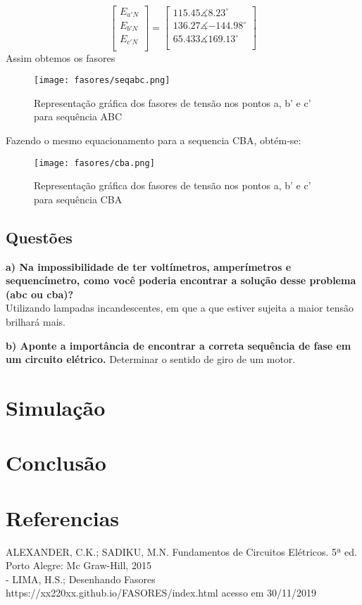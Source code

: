 \documentclass[a4paper, 12pt]{article}
\begin{document}
			\[\begin{bmatrix}
				E_{a'N} \\
				E_{b'N} \\
				E_{c'N} \\
			\end{bmatrix}
			=
			\begin{bmatrix}
				115.45\measuredangle{8.23^\circ} \\
				136.27\measuredangle{-144.98^\circ} \\
				65.433\measuredangle{169.13^\circ} \\
			\end{bmatrix}
			\]
			Assim obtemos os fasores
			\begin{figure}[H]
				\centering %
				\texttt{[image: fasores/seqabc.png]}
				\caption{Representação gráfica dos fasores de tensão nos pontos a, b' e c' para sequência ABC}
			\end{figure}
			\newpage
			Fazendo o mesmo equacionamento para a sequencia CBA, obtém-se:
			\begin{figure}[H]
				\centering %
				\texttt{[image: fasores/cba.png]}
				\caption{Representação gráfica dos fasores de tensão nos pontos a, b' e c' para sequência CBA}
			\end{figure}
			\newpage
			\justifying
			\subsection{Questões}
			\textbf{a) Na impossibilidade de ter voltímetros, amperímetros e sequencímetro, como você poderia
			encontrar a solução desse problema (abc ou cba)?
			}\\
			Utilizando lampadas incandescentes, em que a que estiver sujeita a maior tensão brilhará mais.
			
			\textbf{b) Aponte a importância de encontrar a correta sequência de fase em um circuito elétrico.}
			Determinar o sentido de giro de um motor.
			
			\newpage
			\section{Simulação}
		\justifying
		\newpage
		\section{Conclusão}
		\justifying
		\newpage
		\section*{Referencias}
		\justifying
		\noindent
		ALEXANDER, C.K.; SADIKU, M.N. Fundamentos de Circuitos Elétricos. 5ª ed.
		Porto Alegre: Mc Graw-Hill, 2015\\
		
		\noindent
		[1] - LIMA, H.S.; Desenhando Fasores https://xx220xx.github.io/FASORES/index.html acesso em 30/11/2019 \\
	
\end{document}
